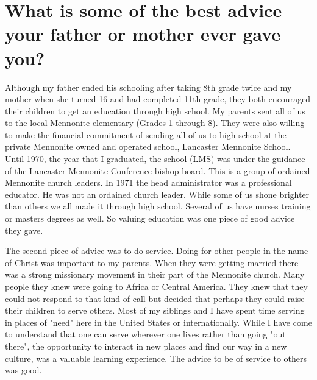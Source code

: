 \section{What is some of the best advice your father or mother ever gave you?}
Although my father ended his schooling after taking 8th grade twice and my mother when she turned 16 and had completed 11th grade, they both encouraged their children to get an education through high school.
My parents sent all of us to the local Mennonite elementary (Grades 1 through 8).
They were also willing to make the financial commitment of sending all of us to high school at the private Mennonite owned and operated school, Lancaster Mennonite School.
Until 1970, the year that I graduated, the school (LMS) was under the guidance of the Lancaster Mennonite Conference bishop board.
This is a group of ordained Mennonite church leaders.
In 1971 the head administrator was a professional educator.
He was not an ordained church leader.
While some of us shone brighter than others we all made it through high school.
Several of us have nurses training or masters degrees as well.
So valuing education was one piece of good advice they gave.

The second piece of advice was to do service.
Doing for other people in the name of Christ was important to my parents.
When they were getting married there was a strong missionary movement in their part of the Mennonite church.
Many people they knew were going to Africa or Central America.
They knew that they could not respond to that kind of call but decided that perhaps they could raise their children to serve others.
Most of my siblings and I have spent time serving in places of "need" here in the United States or internationally.
While I have come to understand that one can serve wherever one lives rather than going "out there", the opportunity to interact in new places and find our way in a new culture, was a valuable learning experience.
The advice to be of service to others was good.

